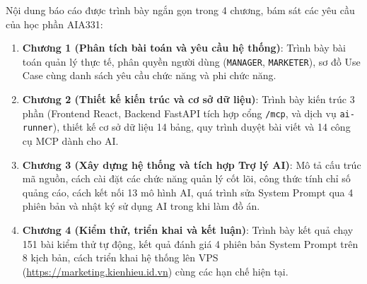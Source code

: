 Nội dung báo cáo được trình bày ngắn gọn trong 4 chương, bám sát các yêu cầu của học phần AIA331:
\begin{enumerate}[noitemsep,topsep=2pt]
 \item \textbf{Chương 1 (Phân tích bài toán và yêu cầu hệ thống)}: Trình bày bài toán quản lý thực tế, phân quyền người dùng (\texttt{MANAGER}, \texttt{MARKETER}), sơ đồ Use Case cùng danh sách yêu cầu chức năng và phi chức năng.
 \item \textbf{Chương 2 (Thiết kế kiến trúc và cơ sở dữ liệu)}: Trình bày kiến trúc 3 phần (Frontend React, Backend FastAPI tích hợp cổng \texttt{/mcp}, và dịch vụ \texttt{ai-runner}), thiết kế cơ sở dữ liệu 14 bảng, quy trình duyệt bài viết và 14 công cụ MCP dành cho AI.
 \item \textbf{Chương 3 (Xây dựng hệ thống và tích hợp Trợ lý AI)}: Mô tả cấu trúc mã nguồn, cách cài đặt các chức năng quản lý cốt lõi, công thức tính chỉ số quảng cáo, cách kết nối 13 mô hình AI, quá trình sửa System Prompt qua 4 phiên bản và nhật ký sử dụng AI trong khi làm đồ án.
 \item \textbf{Chương 4 (Kiểm thử, triển khai và kết luận)}: Trình bày kết quả chạy 151 bài kiểm thử tự động, kết quả đánh giá 4 phiên bản System Prompt trên 8 kịch bản, cách triển khai hệ thống lên VPS (\url{https://marketing.kienhieu.id.vn}) cùng các hạn chế hiện tại.
\end{enumerate}
